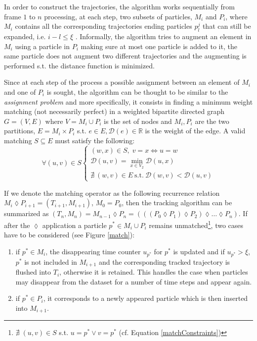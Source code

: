 \documentclass[conference]{IEEEtran}
\begin{document}
In order to construct the trajectories, the algorithm works sequentially from frame $1$ to $n$ processing, at each step, two subsets of particles, $M_i$ and $P_{i}$, where $M_i$ contains all the corresponding trajectories ending particles $p^{j}_l$ that can still be expanded, i.e. $i-l \leq \xi$ .
Informally, the algorithm tries to augment an element in $M_i$ using a particle in $P_i$ making sure at most one particle is added to it, the same particle does not augment two different trajectories and the augmenting is performed s.t. the distance function is minimized.

Since at each step of the process a possible assignment between an element of $M_i$ and one of $P_i$ is sought, the algorithm can be thought to be similar to the \textit{assignment problem} \cite{bellmann1978} and more specifically, it consists in finding a minimum weight matching (not necessarily perfect) in  a weighted bipartite directed graph $G=(V,E)$ where $V={M_i} \cup P_i$ is the set of nodes and ${M_i}, P_i$ are the two partitions, $E = {M_i} \times P_i$ s.t. $e \in E, \mathcal{D}(e) \in \mathbb{R}$ is the weight of the edge.
A valid matching $S \subseteq E$ must satisfy the following: 
\begin{equation}
\forall (u,v) \in S 
\left\{
  \begin{array}{lr}
   (w,x) \in S,\; v=x\Longleftrightarrow u=w\\
   \mathcal{D}(u,v) = \min_{x \in V_2} \mathcal{D}(u,x)  \\
    \nexists \: (w,v) \in E \: \mbox{s.t.} \: \mathcal{D}(w,v) < \mathcal{D}(u,v)
  \end{array}
\right.
\label{matchConstraints}
\end{equation}

If we denote the matching operator  as the following recurrence relation $  M_i \lozenge P_{i+1} = (T_{i+1},M_{i+1}) $, $M_0=P_0$, then the  tracking algorithm can be summarized as $(T_n,M_n) = M_{n-1} \lozenge P_{n}=(((P_0 \lozenge P_1)\lozenge P_2) \lozenge \ldots \lozenge P_n)$.
If after the $\lozenge$ application a particle $p^* \in {M_i} \cup P_i $ remains  unmatched\footnote{$\nexists \;(u,v) \in S $ s.t. $  u=p^* \vee v=p^*$ (cf. Equation \ref{matchConstraints})}, two cases have to be considered (see Figure \ref{match}):
\begin{enumerate}
 \item if $p^* \in M_{i}$, the disappearing time counter $u_{p^*}$ for $p^*$ is updated and if $u_{p^*} > \xi$, $p^*$ is not included in $M_{i+1}$ and the corresponding tracked trajectory is flushed into $T_i$, otherwise it is retained. This handles the case when particles may disappear from the dataset for a number of time steps and appear again. 
 \item if $p^* \in P_i$, it corresponds to a newly appeared particle which is then inserted into $M_{i+1}$. 
\end{enumerate}
 
\end{document}
